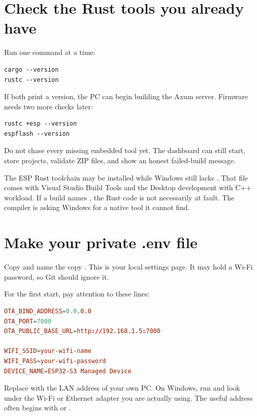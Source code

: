 \section{Check the Rust tools you already have}

Run one command at a time:

\begin{lstlisting}
cargo --version
rustc --version
\end{lstlisting}

If both print a version, the PC can begin building the Axum server. Firmware needs two more checks later:

\begin{lstlisting}
rustc +esp --version
espflash --version
\end{lstlisting}

Do not chase every missing embedded tool yet. The dashboard can still start, store projects, validate ZIP files, and show an honest failed-build message.

\begin{mentorbox}
The ESP Rust toolchain may be installed while Windows still lacks . That file comes with Visual Studio Build Tools and the Desktop development with C++ workload. If a build names , the Rust code is not necessarily at fault. The compiler is asking Windows for a native tool it cannot find.
\end{mentorbox}

\section{Make your private .env file}

Copy  and name the copy . This is your local settings page. It may hold a Wi-Fi password, so Git should ignore it.

For the first start, pay attention to these lines:

\begin{lstlisting}[language=TOML,numbers=none]
OTA_BIND_ADDRESS=0.0.0.0
OTA_PORT=7000
OTA_PUBLIC_BASE_URL=http://192.168.1.5:7000

WIFI_SSID=your-wifi-name
WIFI_PASS=your-wifi-password
DEVICE_NAME=ESP32-S3 Managed Device
\end{lstlisting}

Replace  with the LAN address of your own PC. On Windows, run  and look under the Wi-Fi or Ethernet adapter you are actually using. The useful address often begins with  or .

